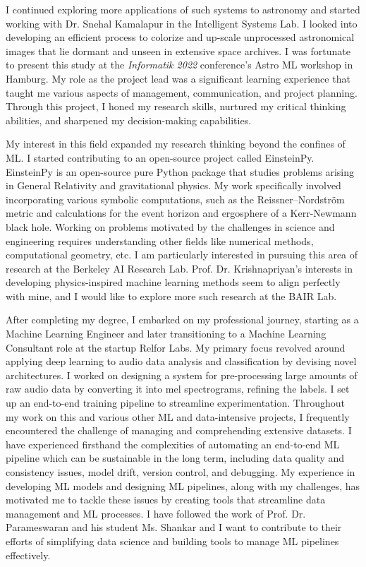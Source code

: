 \documentclass[11pt]{article}
\begin{document}
 \hspace{0.25in}I continued exploring more applications of such systems to astronomy and started
working with Dr. Snehal Kamalapur in the Intelligent Systems Lab. I looked into
developing an efficient process to colorize and up-scale unprocessed
astronomical images that lie dormant and unseen in extensive space archives. I
was fortunate to present this study at the \textit{Informatik 2022} conference’s Astro ML
workshop in Hamburg. My role as the project lead was a significant learning
experience that taught me various aspects of management, communication, and
project planning. Through this project, I honed my research skills, nurtured my
critical thinking abilities, and sharpened my decision-making capabilities. 

 \hspace{0.25in}My interest in this field expanded my research thinking beyond the confines of
ML. I started contributing to an open-source project called EinsteinPy.
EinsteinPy is an open-source pure Python package that studies problems arising
in General Relativity and gravitational physics. My work specifically involved
incorporating various symbolic computations, such as the Reissner–Nordström
metric and calculations for the event horizon and ergosphere of a Kerr-Newmann
black hole. Working on problems motivated by the challenges in science and
engineering requires understanding other fields like numerical methods,
computational geometry, etc. I am particularly interested in pursuing this area
of research at the Berkeley AI Research Lab. Prof. Dr. Krishnapriyan’s interests
in developing physics-inspired machine learning methods seem to align perfectly
with mine, and I would like to explore more such research at the BAIR Lab.

 \hspace{0.25in}After completing my degree, I embarked on my professional journey, starting as a
Machine Learning Engineer and later transitioning to a Machine Learning
Consultant role at the startup Relfor Labs. My primary focus revolved around
applying deep learning to audio data analysis and classification by devising
novel architectures. I worked on designing a system for pre-processing large
amounts of raw audio data by converting it into mel spectrograms, refining the
labels. I set up an end-to-end training pipeline to streamline experimentation.
Throughout my work on this and various other ML and data-intensive projects, I
frequently encountered the challenge of managing and comprehending extensive
datasets. I have experienced firsthand the complexities of automating an
end-to-end ML pipeline which can be sustainable in the long term, including data
quality and consistency issues, model drift, version control, and debugging. My
experience in developing ML models and designing ML pipelines, along with my
challenges, has motivated me to tackle these issues by creating tools that
streamline data management and ML processes. I have followed the work of Prof.
Dr. Parameswaran and his student Ms. Shankar and I want to contribute to their
efforts of simplifying data science and building tools to manage ML pipelines
effectively. 
\end{document}
